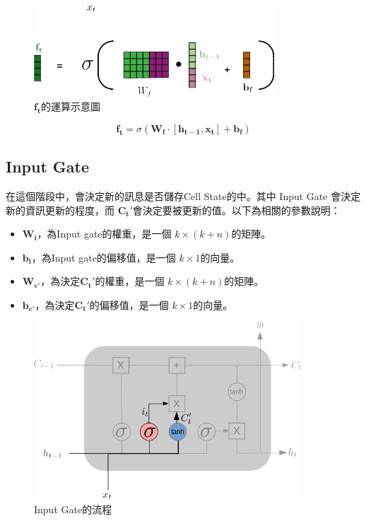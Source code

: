 \begin{figure}[H]
	\centering
	\includegraphics[width=9cm]{./pic/1hRe7Dz4.png}
	\caption{\(\mathbf{f_t}\)的運算示意圖}
	\label{fig:ForgetGateCalculate}
\end{figure}

\begin{equation}
	\label{eqn:ForgetGateCalculate}
	\mathbf{f_t} = \sigma(\mathbf{W_f\cdot[h_{t-1},x_t]+b_f})
\end{equation}


\subsection{Input Gate}

在這個階段中，會決定新的訊息是否儲存Cell State的中。其中 Input Gate 會決定新的資訊更新的程度，而 \(\mathbf{C_t'}\)會決定要被更新的值。以下為相關的參數說明：


\begin{itemize}

	\item 
		\(\mathbf{W_i}\)，為Input gate的權重，是一個 \(k \times (k+n)\)的矩陣。

	\item 
		\(\mathbf{b_i}\)，為Input gate的偏移值，是一個 \(k \times 1\)的向量。

	\item 
		\(\mathbf{W_{c'}}\)，為決定\(\mathbf{C_t'}\)的權重，是一個 \(k \times (k+n)\)的矩陣。

	\item 
		\(\mathbf{b_{c'}}\)，為決定\(\mathbf{C_t'}\)的偏移值，是一個 \(k \times 1\)的向量。

\end{itemize}


\begin{figure}[H]
	\centering
	\includegraphics[width=10cm]{./pic/Htq3Iron.png}
	\caption{Input Gate的流程}
	\label{fig:InputGate}
\end{figure}


